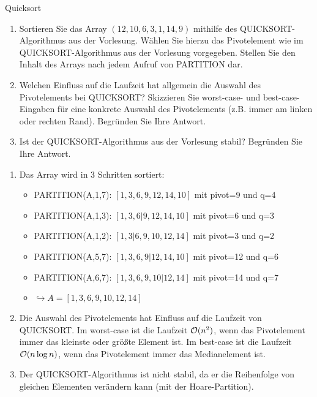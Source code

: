 \documentclass{article}
\begin{document}
\begin{exercise}{Quicksort}
  \begin{enumerate}
    \item Sortieren Sie das Array $(12, 10, 6, 3, 1, 14, 9)$ mithilfe des QUICKSORT-Algorithmus aus der Vorlesung. Wählen Sie hierzu das Pivotelement wie im QUICKSORT-Algorithmus aus der Vorlesung vorgegeben. Stellen Sie den Inhalt des Arrays nach jedem Aufruf von PARTITION dar.
    \item Welchen Einfluss auf die Laufzeit hat allgemein die Auswahl des Pivotelements bei QUICKSORT? Skizzieren Sie worst-case- und best-case-Eingaben für eine konkrete Auswahl des Pivotelements (z.B. immer am linken oder rechten Rand). Begründen Sie Ihre Antwort.
    \item Ist der QUICKSORT-Algorithmus aus der Vorlesung stabil? Begründen Sie Ihre Antwort.
  \end{enumerate}

  \begin{solution}
    \begin{enumerate}
      \item Das Array wird in 3 Schritten sortiert:
            \begin{itemize}
              \item PARTITION(A,1,7): $[1,3,6,9,12,14,10]$ mit pivot=9 und q=4
              \item PARTITION(A,1,3): $[1,3,6|9,12,14,10]$ mit pivot=6 und q=3
              \item PARTITION(A,1,2): $[1,3|6,9,10,12,14]$ mit pivot=3 und q=2
              \item PARTITION(A,5,7): $[1,3,6,9|12,14,10]$ mit pivot=12 und q=6
              \item PARTITION(A,6,7): $[1,3,6,9,10|12,14]$ mit pivot=14 und q=7
              \item[] $\hookrightarrow A = [1,3,6,9,10,12,14]$
            \end{itemize}
      \item Die Auswahl des Pivotelements hat Einfluss auf die Laufzeit von QUICKSORT. Im worst-case ist die Laufzeit $\mathcal{O}(n^2)$, wenn das Pivotelement immer das kleinste oder größte Element ist. Im best-case ist die Laufzeit $\mathcal{O}(n \log n)$, wenn das Pivotelement immer das Medianelement ist.
      \item Der QUICKSORT-Algorithmus ist nicht stabil, da er die Reihenfolge von gleichen Elementen verändern kann (mit der Hoare-Partition).
    \end{enumerate}
  \end{solution}
\end{exercise}
\end{document}

